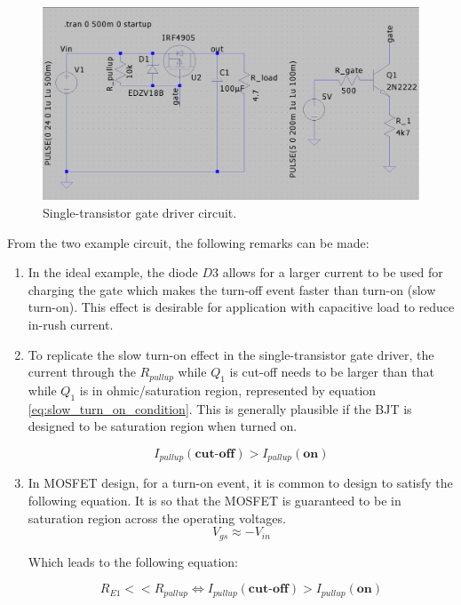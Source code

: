 \documentclass[main.tex]{subfiles}
\begin{document}
    \begin{figure}[!h]
        \centerline{\includegraphics[width=\linewidth]{media/pmos_switch_npn.png}}
        \caption{Single-transistor gate driver circuit.} 
        \label{fig:single_transistor_gate_drive}
    \end{figure}

    \justify
    From the two example circuit, the following remarks can be made:
    \begin{enumerate}
        \item In the ideal example, the diode $D3$ allows for a larger current to be used for charging the gate which makes the turn-off event faster than turn-on (slow turn-on). This effect is desirable for application with capacitive load to reduce in-rush current.

        \item To replicate the slow turn-on effect in the single-transistor gate driver, the current through the $R_{pullup}$ while $Q_1$ is cut-off needs to be larger than that while $Q_1$ is in ohmic/saturation region, represented by equation \eqref{eq:slow_turn_on_condition}. This is generally plausible if the BJT is designed to be saturation region when turned on.
        
        \begin{equation} \label{eq:slow_turn_on_condition}
            I_{pullup}(\textbf{cut-off}) > I_{pullup}(\textbf{on})
        \end{equation}

        \item In MOSFET design, for a turn-on event, it is common to design to satisfy the following equation. It is so that the MOSFET is guaranteed to be in saturation region across the operating voltages.
        \begin{equation}
            V_{gs} \approx -V_{in}
        \end{equation}

        Which leads to the following equation:

        \begin{equation} \label{eq:deep_saturation_condition}
            R_{E1} << R_{pullup} \Longleftrightarrow I_{pullup}(\textbf{cut-off}) > I_{pullup}(\textbf{on})
        \end{equation}
        
    \end{enumerate}
\end{document}
